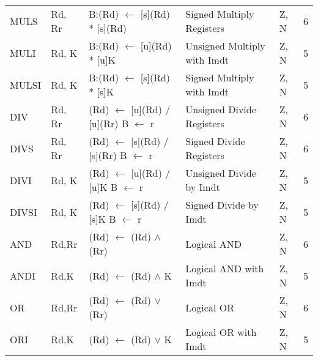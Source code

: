 \begin{footnotesize}
\begin{tabular}{|p{14.5mm}|p{14mm}|p{47mm}|p{46.5mm}|p{14mm}|p{10mm}|}
    MULS     & Rd, Rr    & B:(Rd) $\leftarrow$ {[}s{]}(Rd) * {[}s{]}(Rd)                                   & Signed Multiply Registers                 & Z, N           & 6      \\
    MULI     & Rd, K     & B:(Rd) $\leftarrow$ {[}u{]}(Rd) * {[}u{]}K                                      & Unsigned Multiply with Imdt               & Z, N           & 5      \\
    MULSI    & Rd, K     & B:(Rd) $\leftarrow$ {[}s{]}(Rd) * {[}s{]}K                                    & Signed Multiply with Imdt                 & Z, N           & 5      \\
    DIV      & Rd, Rr    & (Rd) $\leftarrow$ {[}u{]}(Rd) / {[}u{]}(Rr) \newline B $\leftarrow$ r                        & Unsigned Divide Registers                 & Z, N           & 6      \\
    DIVS     & Rd, Rr    & (Rd) $\leftarrow$ {[}s{]}(Rd) / {[}s{]}(Rr) \newline B $\leftarrow$ r                        & Signed Divide Registers                   & Z, N           & 6      \\
    DIVI     & Rd, K     & (Rd) $\leftarrow$ {[}u{]}(Rd) / {[}u{]}K \newline B $\leftarrow$ r                           & Unsigned Divide by Imdt                   & Z, N           & 5      \\
    DIVSI    & Rd, K     & (Rd) $\leftarrow$ {[}s{]}(Rd) / {[}s{]}K \newline B $\leftarrow$ r                           & Signed Divide by Imdt                     & Z, N           & 5      \\
    AND      & Rd,Rr     & (Rd) $\leftarrow$ (Rd) $\land$ (Rr)                                                     & Logical AND                               & Z, N           & 6      \\
    ANDI     & Rd,K      & (Rd) $\leftarrow$ (Rd) $\land$ K                                                        & Logical AND with Imdt                     & Z, N           & 5      \\
    OR       & Rd,Rr     & (Rd) $\leftarrow$ (Rd) $\lor$ (Rr)                                                     & Logical OR                                & Z, N           & 6      \\
    ORI      & Rd,K      & (Rd) $\leftarrow$ (Rd) $\lor$ K                                                        & Logical OR with Imdt                      & Z, N           & 5      \\

\end{tabular}
\end{footnotesize}
